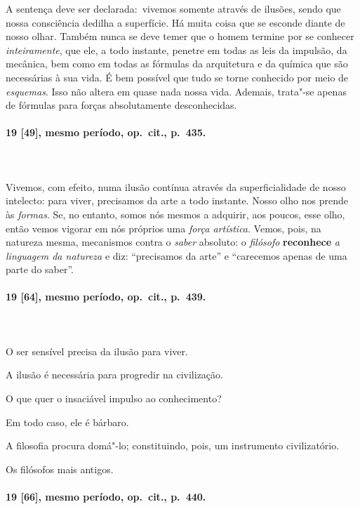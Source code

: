 A sentença deve ser declarada:~vivemos somente através de ilusões, sendo
que nossa consciência dedilha a superfície. Há muita coisa que se
esconde diante de nosso olhar. Também nunca se deve temer que o homem
termine por se conhecer \textit{inteiramente}, que ele, a todo
instante, penetre em todas as leis da impulsão, da mecânica, bem como
em todas as fórmulas da arquitetura e da química que são necessárias à
sua vida. É bem possível que tudo se torne conhecido por meio de
\textit{esquemas}. Isso não altera em quase nada nossa vida. Ademais,
trata"-se apenas de fórmulas para forças absolutamente desconhecidas.

\pagebreak

\paragraph*{19 [49], mesmo período, op.~cit., p.~435.}
\ \\
\ \\

Vivemos, com efeito, numa ilusão contínua através da superficialidade de
nosso intelecto: para viver, precisamos da arte a todo instante. Nosso
olho nos prende às \textit{formas}. Se, no entanto, somos nós mesmos 
a adquirir, aos poucos, esse olho, então vemos vigorar em nós próprios
uma \textit{força artística}. Vemos, pois, na natureza mesma,
mecanismos contra o \textit{saber} absoluto: o \textit{filósofo}
\textbf{reconhece} \textit{a linguagem da natureza} e diz: “precisamos da
arte” e “carecemos apenas de uma parte do saber”. 

\pagebreak
\paragraph*{19 [64], mesmo período, op.~cit., p.~439.}
\ \\
\ \\

O ser sensível precisa da ilusão para viver.

A ilusão é necessária para progredir na civilização.

O que quer o insaciável impulso ao conhecimento?

Em todo caso, ele é bárbaro.

A filosofia procura domá"-lo; constituindo, pois, um instrumento
civilizatório.

Os filósofos mais antigos. 

\pagebreak
\paragraph*{19 [66], mesmo período, op.~cit., p.~440.}
\ \\
\ \\

